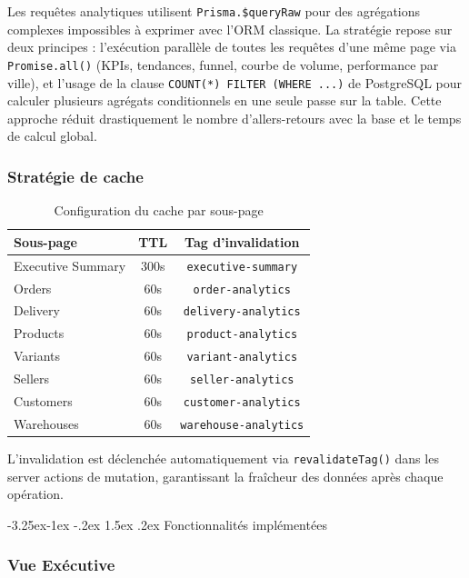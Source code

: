 \documentclass[12pt,a4paper,openany]{report}
\makeatletter
\renewcommand\subsection{\@startsection{subsection}{2}{\z@}%
  {-3.25ex\@plus -1ex \@minus -.2ex}%
  {1.5ex \@plus .2ex}%
  {\needspace{8\baselineskip}\normalfont\large\bfseries\color{primary!80!black}}}
\newcommand{\code}[1]{\texttt{#1}}
\makeatother
\begin{document}
Les requêtes analytiques utilisent \code{Prisma.\$queryRaw} pour des agrégations complexes impossibles à exprimer avec l'ORM classique. La stratégie repose sur deux principes : l'exécution parallèle de toutes les requêtes d'une même page via \code{Promise.all()} (KPIs, tendances, funnel, courbe de volume, performance par ville), et l'usage de la clause \code{COUNT(*) FILTER (WHERE ...)} de PostgreSQL pour calculer plusieurs agrégats conditionnels en une seule passe sur la table. Cette approche réduit drastiquement le nombre d'allers-retours avec la base et le temps de calcul global.

\subsubsection{Stratégie de cache}

\begin{table}[H]
\centering
{}
\begin{tabular}{lcc}
\toprule
\rowcolor{headerblue!20}
\textbf{Sous-page} & \textbf{TTL} & \textbf{Tag d'invalidation} \\
\midrule
Executive Summary & 300s & \texttt{executive-summary} \\
Orders & 60s & \texttt{order-analytics} \\
Delivery & 60s & \texttt{delivery-analytics} \\
Products & 60s & \texttt{product-analytics} \\
Variants & 60s & \texttt{variant-analytics} \\
Sellers & 60s & \texttt{seller-analytics} \\
Customers & 60s & \texttt{customer-analytics} \\
Warehouses & 60s & \texttt{warehouse-analytics} \\
\bottomrule
\end{tabular}
\caption{Configuration du cache par sous-page}
\end{table}

L'invalidation est déclenchée automatiquement via \code{revalidateTag()} dans les server actions de mutation, garantissant la fraîcheur des données après chaque opération.

\subsection{Fonctionnalités implémentées}

\subsubsection{Vue Exécutive}
\end{document}
